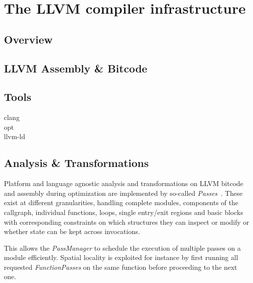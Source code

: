 \section{The LLVM compiler infrastructure}

\subsection{Overview}

\subsection{LLVM Assembly \& Bitcode}


\subsection{Tools}



\begin{description}
    \item[clang] 
    \item[opt] 
    \item[llvm-ld] 
\end{description}

\subsection{Analysis \& Transformations}

Platform and language agnostic analysis and transformations on LLVM bitcode and
assembly during optimization are implemented by so-called
\emph{Passes}~\cite{llvm-passes}. These exist at different granularities,
handling complete modules,
components of the callgraph, individual functions, loops, single entry/exit
regions and basic blocks with corresponding constraints on which structures
they can inspect or modify or whether state can be kept across invocations.

This allows the \emph{PassManager} to schedule the execution of multiple passes
on a module efficiently. Spatial locality is exploited for instance by first
running all requested \emph{FunctionPasses} on the same function before
proceeding to the next one.

